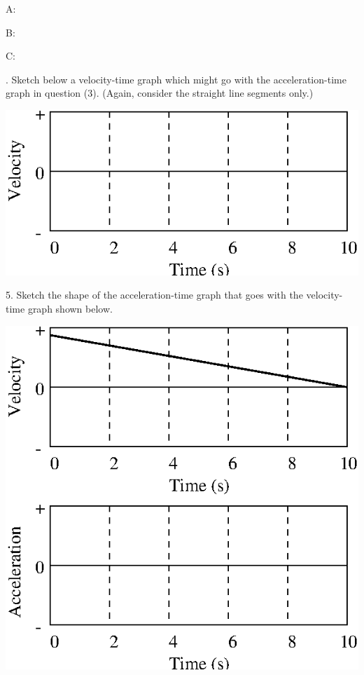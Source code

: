 \hspace{20mm}A: 
\answerspace{10mm}

\hspace{20mm}B: 
\answerspace{10mm}

\hspace{20mm}C:
\answerspace{10mm}

. Sketch below a velocity-time graph which might go with the acceleration-time
graph in question (3). (Again, consider the straight line segments only.)

\vspace{0.3cm}
{\par\centering \includegraphics{slowing/slowing_fig9.eps} \par}
\vspace{0.3cm}

5. Sketch the shape of the acceleration-time graph that goes with the velocity-time
graph shown below.

\vspace{0.3cm}
{\par\centering \includegraphics{slowing/slowing_fig10.eps} \par}
\vspace{0.3cm}

